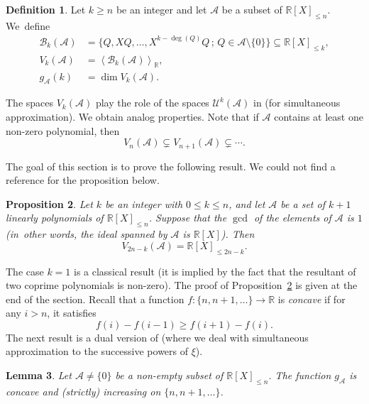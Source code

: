 \documentclass[10pt,a4paper]{amsart}
\numberwithin{equation}{section}
\newcommand\bR{\mathbb{R}}
\newcommand\cA{\mathcal{A}}
\newcommand\cB{\mathcal{B}}
\newcommand\cU{\mathcal{U}}
\newcommand{\Vect}[2][]{\left\la #2\right\ra_{#1}}
\let\subset \subseteq
\let\la\langle
\let\ra\rangle
\theoremstyle{definition}
\newtheorem{Def}{Definition}[section]
\theoremstyle{plain}
\newtheorem{Prop}[Def]{Proposition}
\newtheorem{Lem}[Def]{Lemma}
\begin{document}
\begin{Def}
\label{Def: fonction g_A(N)}
Let $k\geq n$ be an integer and let $\cA$ be a subset of $\bR[X]_{\leq n}$. We~define
\begin{align*}
\cB_k(\cA) &= \big\{ Q, XQ,\dots, X^{k-\deg(Q)}Q \,;\, Q\in\cA\setminus\{0\} \big\} \subset \bR[X]_{\leq k}, \\
V_k(\cA) &= \Vect[\bR]{\cB_k(\cA)}, \\
g_\cA(k) &= \dim V_k(\cA).
\end{align*}
\end{Def}

The spaces $V_k(\cA)$ play the role of the spaces $\cU^{k}(\cA)$ in \cite[\S3]{poels2022simultaneous} (for simultaneous approximation). We obtain analog properties. Note that if $\cA$ contains at least one non-zero polynomial, then
\begin{equation}
\label{eq: suite V_k(A) strict. croissante}
V_n(\cA) \varsubsetneq V_{n+1}(\cA) \varsubsetneq\cdots.
\end{equation}

The goal of this section is to prove the following result. We could not find a reference for the proposition below.

\begin{Prop}
\label{Cor: V_2n-k = tout l'espace}
Let $k$ be an integer with $0\leq k \leq n$, and let $\cA$ be a set of $k+1$ linearly polynomials of $\bR[X]_{\leq n}$. Suppose that the $\gcd$ of the elements of $\cA$ is $1$ (in~other words, the ideal spanned by $\cA$ is $\bR[X]$). Then
\begin{equation}
\label{Cor: V_N = tout l'espace}
V_{2n-k}(\cA) = \bR[X]_{\leq 2n-k}.
\end{equation}
\end{Prop}

The case $k=1$ is a classical result (it is implied by the fact that the resultant of two coprime polynomials is non-zero). The proof of Proposition~\ref{Cor: V_2n-k = tout l'espace} is given at the end of the section. Recall that a function $f : \{n,n+1, \ldots \} \to \bR$ is \emph{concave} if for any $i > n$, it satisfies
\[
f(i)-f(i-1) \geq f(i+1)-f(i).
\]
The next result is a dual version of \cite[Prop.\,3.1]{poels2022simultaneous} (where we deal with simultaneous approximation to the successive powers of $\xi$).

\begin{Lem}
Let $\cA \neq \{0\}$ be a non-empty subset of $\bR[X]_{\leq n}$. The function $g_\cA$ is concave and (strictly) increasing on $\{n,n+1,\ldots\}$.
\end{Lem}
\end{document}
